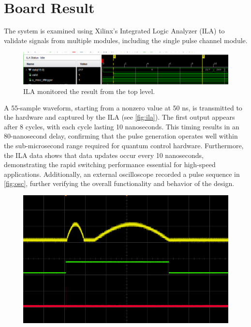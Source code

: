 \section{Board Result}
The system is examined using Xilinx's Integrated Logic Analyzer (ILA) to validate signals from multiple modules, including the single pulse channel module.  
\begin{figure}[h]
    \centering
    \includegraphics[width=1\linewidth]{figures/ila.png}
    \caption{ILA monitored the result from the top level.}
    \label{fig:ila}
\end{figure}
A 55-sample waveform, starting from a nonzero value at 50 ns, is transmitted to the hardware and captured by the ILA (see \autoref{fig:ila}). The first output appears after 8 cycles, with each cycle lasting 10 nanoseconds. This timing results in an 80-nanosecond delay, confirming that the pulse generation operates well within the sub-microsecond range required for quantum control hardware. Furthermore, the ILA data shows that data updates occur every 10 nanoseconds, demonstrating the rapid switching performance essential for high-speed applications. Additionally, an external oscilloscope recorded a pulse sequence in \autoref{fig:osc}, further verifying the overall functionality and behavior of the design.
\begin{figure}[h]
    \centering
    \includegraphics[width=.85\linewidth]{figures/one_trig_seq.png}
    \caption{}
    \label{fig:osc}
\end{figure}

